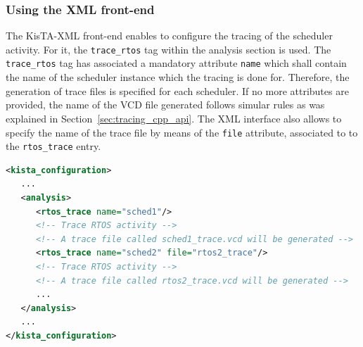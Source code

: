 \subsubsection{Using the XML front-end}
\label{sec:tracing_xml}

The KisTA-XML front-end enables to configure the tracing of the scheduler activity.
%
For it, the \texttt{trace\_rtos} tag within the analysis section is used.
The \texttt{trace\_rtos} tag has associated a mandatory attribute \texttt{name} which shall contain the name of the scheduler instance which the tracing is done for.
%
Therefore, the generation of trace files is specified for each scheduler.
%
If no more attributes are provided, the name of the VCD file generated follows simular rules as was explained in Section~\ref{sec:tracing_cpp_api}.
%
The XML interface also allows to specify the name of the trace file by means of the \texttt{file} attribute, associated to to the \texttt{rtos\_trace} entry.

\begin{lstlisting}[language=XML, caption={Setting tracing from the XML interface.}, label=list:xml_trace_setting]
<kista_configuration>
   ...
   <analysis>
      <rtos_trace name="sched1"/>
      <!-- Trace RTOS activity -->
      <!-- A trace file called sched1_trace.vcd will be generated -->
      <rtos_trace name="sched2" file="rtos2_trace"/>
      <!-- Trace RTOS activity -->
      <!-- A trace file called rtos2_trace.vcd will be generated -->
      ...
   </analysis>
   ...
</kista_configuration>
\end{lstlisting}



